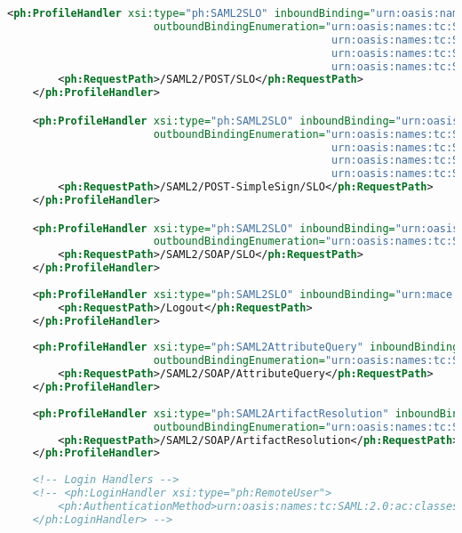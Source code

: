 \begin{lstlisting}[language=xml]
    <ph:ProfileHandler xsi:type="ph:SAML2SLO" inboundBinding="urn:oasis:names:tc:SAML:2.0:bindings:HTTP-POST"
                       outboundBindingEnumeration="urn:oasis:names:tc:SAML:2.0:bindings:HTTP-Redirect
                                                   urn:oasis:names:tc:SAML:2.0:bindings:HTTP-POST-SimpleSign
                                                   urn:oasis:names:tc:SAML:2.0:bindings:HTTP-POST
                                                   urn:oasis:names:tc:SAML:2.0:bindings:HTTP-Artifact">
        <ph:RequestPath>/SAML2/POST/SLO</ph:RequestPath>
    </ph:ProfileHandler>

    <ph:ProfileHandler xsi:type="ph:SAML2SLO" inboundBinding="urn:oasis:names:tc:SAML:2.0:bindings:HTTP-POST-SimpleSign" 
                       outboundBindingEnumeration="urn:oasis:names:tc:SAML:2.0:bindings:HTTP-Redirect
                                                   urn:oasis:names:tc:SAML:2.0:bindings:HTTP-POST-SimpleSign
                                                   urn:oasis:names:tc:SAML:2.0:bindings:HTTP-POST
                                                   urn:oasis:names:tc:SAML:2.0:bindings:HTTP-Artifact">
        <ph:RequestPath>/SAML2/POST-SimpleSign/SLO</ph:RequestPath>
    </ph:ProfileHandler>

    <ph:ProfileHandler xsi:type="ph:SAML2SLO" inboundBinding="urn:oasis:names:tc:SAML:2.0:bindings:SOAP"
                       outboundBindingEnumeration="urn:oasis:names:tc:SAML:2.0:bindings:SOAP">
        <ph:RequestPath>/SAML2/SOAP/SLO</ph:RequestPath>
    </ph:ProfileHandler>
    
    <ph:ProfileHandler xsi:type="ph:SAML2SLO" inboundBinding="urn:mace:shibboleth:2.0:profiles:LocalLogout">
        <ph:RequestPath>/Logout</ph:RequestPath>
    </ph:ProfileHandler>
    
    <ph:ProfileHandler xsi:type="ph:SAML2AttributeQuery" inboundBinding="urn:oasis:names:tc:SAML:2.0:bindings:SOAP" 
                       outboundBindingEnumeration="urn:oasis:names:tc:SAML:2.0:bindings:SOAP">
        <ph:RequestPath>/SAML2/SOAP/AttributeQuery</ph:RequestPath>
    </ph:ProfileHandler>
    
    <ph:ProfileHandler xsi:type="ph:SAML2ArtifactResolution" inboundBinding="urn:oasis:names:tc:SAML:2.0:bindings:SOAP" 
                       outboundBindingEnumeration="urn:oasis:names:tc:SAML:2.0:bindings:SOAP">
        <ph:RequestPath>/SAML2/SOAP/ArtifactResolution</ph:RequestPath>
    </ph:ProfileHandler>
    
    <!-- Login Handlers -->
    <!-- <ph:LoginHandler xsi:type="ph:RemoteUser">
        <ph:AuthenticationMethod>urn:oasis:names:tc:SAML:2.0:ac:classes:unspecified</ph:AuthenticationMethod>
    </ph:LoginHandler> -->
    

\end{lstlisting}
